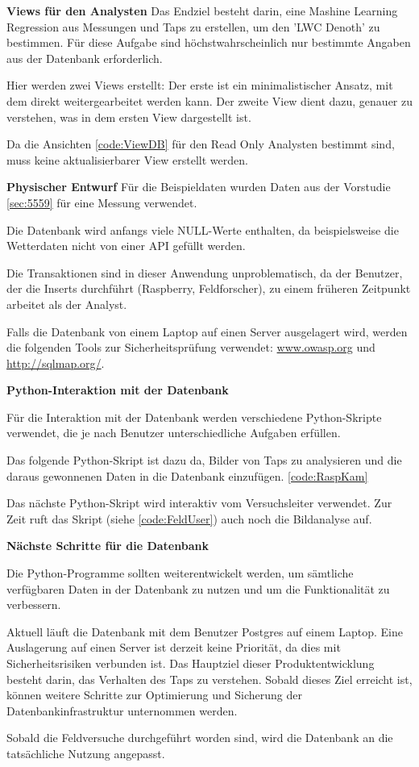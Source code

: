 \textbf{Views für den Analysten}
Das Endziel besteht darin, eine Mashine Learning Regression aus Messungen und Taps zu erstellen, um den 'LWC Denoth' zu bestimmen. Für diese Aufgabe sind höchstwahrscheinlich nur bestimmte Angaben aus der Datenbank erforderlich.

Hier werden zwei Views erstellt: Der erste ist ein minimalistischer Ansatz, mit dem direkt weitergearbeitet werden kann. Der zweite View dient dazu, genauer zu verstehen, was in dem ersten View dargestellt ist.

Da die Ansichten \ref{code:ViewDB} für den Read Only Analysten bestimmt sind, muss keine aktualisierbarer View erstellt werden.



\textbf{Physischer Entwurf}
Für die Beispieldaten wurden Daten aus der Vorstudie \ref{sec:5559} für eine Messung verwendet.

Die Datenbank wird anfangs viele NULL-Werte enthalten, da beispielsweise die Wetterdaten nicht von einer API gefüllt werden.

Die Transaktionen sind in dieser Anwendung unproblematisch, da der Benutzer, der die Inserts durchführt (Raspberry, Feldforscher), zu einem früheren Zeitpunkt arbeitet als der Analyst.

Falls die Datenbank von einem Laptop auf einen Server ausgelagert wird, werden die folgenden Tools zur Sicherheitsprüfung verwendet: \href{https://www.owasp.org}{www.owasp.org} und \href{http://sqlmap.org/}{http://sqlmap.org/}.

\textbf{Python-Interaktion mit der Datenbank}

Für die Interaktion mit der Datenbank werden verschiedene Python-Skripte verwendet, die je nach Benutzer unterschiedliche Aufgaben erfüllen.

Das folgende Python-Skript ist dazu da, Bilder von Taps zu analysieren und die daraus gewonnenen Daten in die Datenbank einzufügen. \ref{code:RaspKam}

Das nächste Python-Skript wird interaktiv vom Versuchsleiter verwendet. Zur Zeit ruft das Skript (siehe  \ref{code:FeldUser}) auch noch die Bildanalyse auf.


\textbf{Nächste Schritte für die Datenbank}

Die Python-Programme sollten weiterentwickelt werden, um sämtliche verfügbaren Daten in der Datenbank zu nutzen und um die Funktionalität zu verbessern.

Aktuell läuft die Datenbank mit dem Benutzer Postgres auf einem Laptop. Eine Auslagerung auf einen Server ist derzeit keine Priorität, da dies mit Sicherheitsrisiken verbunden ist. Das Hauptziel dieser Produktentwicklung besteht darin, das Verhalten des Taps zu verstehen. Sobald dieses Ziel erreicht ist, können weitere Schritte zur Optimierung und Sicherung der Datenbankinfrastruktur unternommen werden.

Sobald die Feldversuche durchgeführt worden sind, wird die Datenbank an die tatsächliche Nutzung angepasst.

